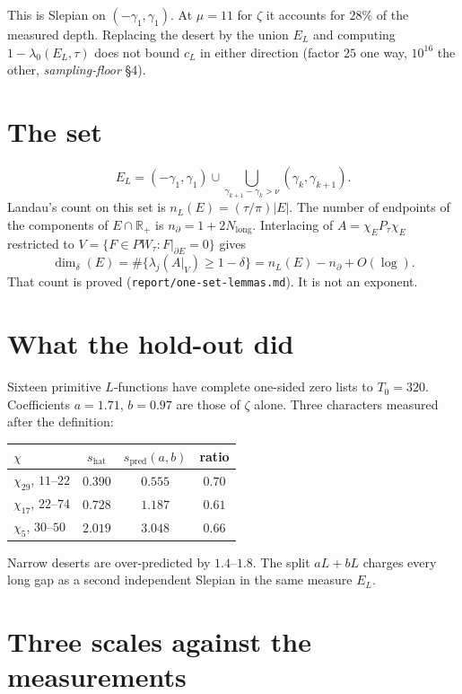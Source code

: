 \documentclass[11pt]{article}
\theoremstyle{remark}\newtheorem*{remark}{Remark}
\begin{document}
This is Slepian on \((-\gamma_1,\gamma_1)\). At \(\mu=11\) for \(\zeta\)
it accounts for \(28\%\) of the measured depth. Replacing the desert
by the union \(E_L\) and computing \(1-\lambda_0(E_L,\tau)\) does not
bound \(c_L\) in either direction (factor \(25\) one way, \(10^{16}\)
the other, \emph{sampling-floor} §4).

\section{The set}

\[
E_L=(- \gamma_1,\gamma_1)\cup\bigcup_{\gamma_{k+1}-\gamma_k>\nu}(\gamma_k,\gamma_{k+1}).
\]
Landau's count on this set is \(n_L(E)=(\tau/\pi)|E|\). The number of
endpoints of the components of \(E\cap\mathbb R_+\) is
\(n_\partial=1+2N_{\mathrm{long}}\). Interlacing of
\(A=\chi_E P_\tau\chi_E\) restricted to
\(V=\{F\in PW_\tau:F|_{\partial E}=0\}\) gives
\[
\dim_\delta(E)=\#\{\lambda_j(A|_V)\ge 1-\delta\}=n_L(E)-n_\partial+O(\log).
\]
That count is proved (\texttt{report/one-set-lemmas.md}). It is not
an exponent.

\section{What the hold-out did}

Sixteen primitive \(L\)-functions have complete one-sided zero lists
to \(T_0=320\). Coefficients \(a=1.71\), \(b=0.97\) are those of
\(\zeta\) alone. Three characters measured after the definition:

\begin{center}\small
\begin{tabular}{lccc}\toprule
\(\chi\) & \(s_{\mathrm{hat}}\) & \(s_{\mathrm{pred}}(a,b)\) & ratio\\\midrule
\(\chi_{29}\), \(11\)--\(22\) & \(0.390\) & \(0.555\) & \(0.70\)\\
\(\chi_{17}\), \(22\)--\(74\) & \(0.728\) & \(1.187\) & \(0.61\)\\
\(\chi_5\), \(30\)--\(50\) & \(2.019\) & \(3.048\) & \(0.66\)\\\bottomrule
\end{tabular}
\end{center}

Narrow deserts are over-predicted by \(1.4\)--\(1.8\). The split
\(aL+bL\) charges every long gap as a second independent Slepian in
the same measure \(E_L\).

\section{Three scales against the measurements}
\end{document}
